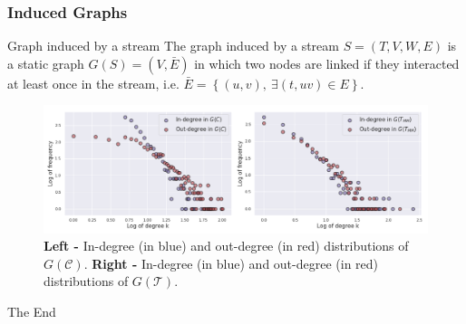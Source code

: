 \documentclass{beamer}
\begin{document}


\begin{frame}
\frametitle{Induced Graphs}

\begin{block}{Graph induced by a stream}
The graph induced by a stream $S = \left(T, V, W, E \right)$ is a static graph $ G \left(S \right) = \left(V, \bar{E} \right)$ in which two nodes are linked if they interacted at least once in the stream, i.e. $ \bar{E} = \left\{ \left( u, v \right),\ \exists \left(t, uv \right) \in E \right\}$.
\end{block}

\bigskip

\begin{figure}
\includegraphics[width=.9\linewidth]{./figures/degree_distribution}
\caption{\textbf{Left -} In-degree (in blue) and out-degree (in red) distributions of $G \left( \mathcal{C} \right)$. \textbf{Right -} In-degree (in blue) and out-degree (in red) distributions of $G \left( \mathcal{T} \right)$.}
\end{figure}

\end{frame}



\begin{frame}
\Huge{\centerline{The End}}
\end{frame}

\end{document}
